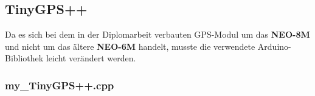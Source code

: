 \subsection{TinyGPS++}
Da es sich bei dem in der Diplomarbeit verbauten GPS-Modul um das \textbf{NEO-8M} 
und nicht um das ältere \textbf{NEO-6M} handelt, musste die verwendete Arduino-Bibliothek\textsuperscript{\cite{ArduinoBibliothekGPS}} leicht verändert werden.
\subsubsection{my\_TinyGPS++.cpp}
